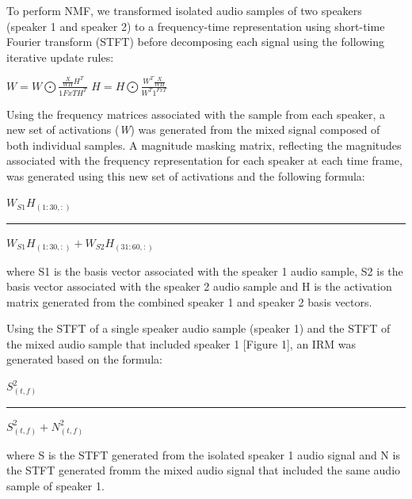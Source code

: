 \documentclass[journal, a4paper]{IEEEtran}
\begin{document}
To perform NMF, we transformed isolated audio samples of two speakers (speaker 1 and speaker 2) to a frequency-time representation using short-time Fourier transform (STFT) before decomposing each signal using the following iterative update rules:
\newline

$W = W \bigodot \frac{\frac{X}{WH}H^T}{1{FxT}H^T}$ \hspace{1cm} $H = H \bigodot \frac{W^T\frac{X}{WH}}{W^T1^{FxT}}$
\newline

Using the frequency matrices associated with the sample from each speaker, a new set of activations (\textit{W}) was generated from the mixed signal composed of both individual samples. A magnitude masking matrix, reflecting the magnitudes associated with the frequency representation for each speaker at each time frame, was generated using this new set of activations and the following formula:

\begin{center}
$W_{S1}H_{(1:30,:)}$

\rule[1pt]{100pt}{.4pt}

$W_{S1}H_{(1:30,:)}+W_{S2}H_{(31:60,:)}  $

\end{center}


\begin{flushleft}
where S1 is the basis vector associated with the speaker 1 audio sample, S2 is the basis vector associated with the speaker 2 audio sample and H is the activation matrix generated from the combined speaker 1 and speaker 2 basis vectors.\cite{ClassNMF}
\end{flushleft}

Using the STFT of a single speaker audio sample (speaker 1) and the STFT of the mixed audio sample that included speaker 1 [Figure 1], an IRM was generated based on the formula:
\begin{center}
$S_{(t,f)}^2$

\rule[1pt]{40pt}{.4pt}

$S_{(t,f)}^2 + N_{(t,f)}^2  $

\end{center}


\begin{flushleft}

where S is the STFT generated from the isolated speaker 1 audio signal and N is the STFT generated fromm the mixed audio signal that included the same audio sample of speaker 1.\cite{DBLP:journals/corr/abs-1708-07524}

\end{flushleft}
\end{document}
